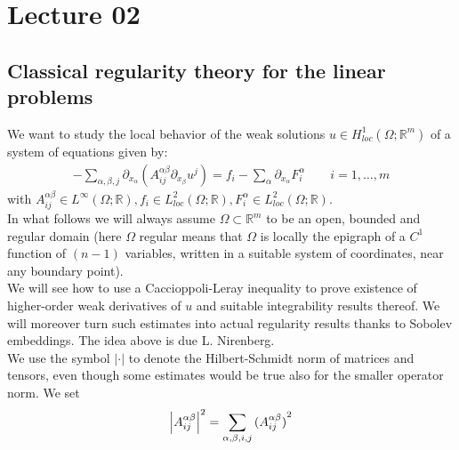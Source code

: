 \chapter{Lecture 02}

\section{Classical regularity theory for the linear problems}
We want to study the local behavior of the weak solutions \(u \in H_{loc}^{1}(\Omega; \mathbb{R}^{m})\) of a system of equations given by:
\begin{gather}
	- \sum_{\alpha, \beta, j} \partial_{x_\alpha} (A_{ij}^{\alpha \beta} \partial_{x_{\beta}} u^{j}) = f_{i} - \sum_{\alpha}^{} \partial_{x_{\alpha}} F_{i}^{\alpha}\qquad i=1,\dots,m
\end{gather}
with \(A_{ij}^{\alpha \beta} \in L^{\infty}(\Omega;\mathbb{R}), f_{i}\in L^{2}_{loc}(\Omega;\mathbb{R}), F_{i}^{\alpha}\in L_{loc}^{2}(\Omega;\mathbb{R})\).\\
In what follows we will always assume \(\Omega \subset \mathbb{R}^{m}\) to be an open, bounded and regular domain (here \(\Omega \) regular means that \(\Omega \) is locally the epigraph of a \(C^{1}\) function of \((n-1)\) variables, written in a suitable system of coordinates, near any boundary point).\\
We will see how to use a Caccioppoli-Leray inequality to prove existence of higher-order weak derivatives of \(u\) and suitable integrability results thereof. We will moreover turn such estimates into actual regularity results thanks to Sobolev embeddings. The idea above is due L. Nirenberg.\\
We use the symbol \(\vert \cdot \vert \) to denote the Hilbert-Schmidt norm of matrices and tensors, even though some estimates would be true also for the smaller operator norm.
We set
\begin{gather}
	\left\lvert A_{ij}^{\alpha \beta}\right\rvert^{2} = \sum_{\alpha, \beta,i, j}  {(A_{ij}^{\alpha \beta})}^{2}
\end{gather}

